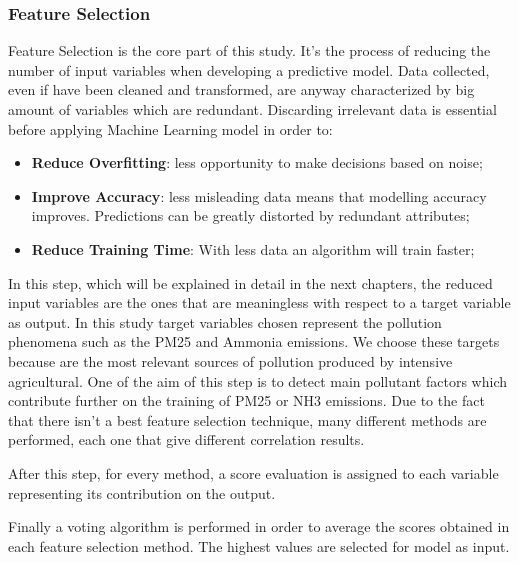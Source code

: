 \subsubsection{Feature Selection}
Feature Selection is the core part of this study. It's the process of reducing the number of input variables when developing a predictive model. 
Data collected, even if have been cleaned and transformed, are anyway characterized by big amount of variables which are redundant.
Discarding irrelevant data is essential before applying Machine Learning model in order to:
\begin{itemize}
\item \textbf{Reduce Overfitting}: less opportunity to make decisions based on noise;
\item \textbf{Improve Accuracy}: less misleading data means that modelling accuracy improves. Predictions can be greatly distorted by redundant attributes;
\item \textbf{Reduce Training Time}: With less data an algorithm will train faster;
\end{itemize}
In this step, which will be explained in detail in the next chapters, the reduced input variables are the ones that are meaningless with respect to a target variable as output. \newline
In this study target variables chosen represent the pollution phenomena such as the PM25 and Ammonia emissions. We choose these targets because are the most relevant sources of pollution produced by intensive agricultural.\newline
One of the aim of this step is to detect main pollutant factors which contribute further on the training of PM25 or NH3 emissions.
Due to the fact that there isn’t a best feature selection technique, many different methods are performed, each one that give different correlation results.\par
After this step, for every method, a score evaluation is assigned to each variable representing its contribution on the output.\par
Finally a voting algorithm is performed in order to average the scores obtained in each feature selection method. 
The highest values are selected for model as input.
